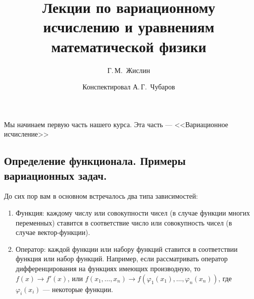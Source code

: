 \documentclass[12pt,a4paper,openany,fleqn]{book}
\theoremstyle{definition}
\begin{document}
	\author{Г.\,М.~Жислин}
	\title{Лекции по вариационному исчислению и уравнениям математической физики}
	\date{Конспектировал А.\,Г.~Чубаров}
	
	
	
	\maketitle
	
	
	\renewcommand{\thepart}{\Asbuk{part}}
	\renewcommand{\thechapter}{\arabic{chapter}}
	\renewcommand{\thesection}{\arabic{section}}
	\renewcommand{\thesubsection}{\Roman{subsection}}
	\renewcommand{\thefootnote}{\roman{footnote}}
	\renewcommand{\phi}{\varphi}

	
	\chapter{}
	\label{lecture1}
	Мы начинаем первую часть нашего курса. Эта часть --- <<Вариационное исчисление>>
	\section{Определение функционала. Примеры вариационных задач.}
	\label{lecture1section1}
	До сих пор вам в основном встречалось два типа зависимостей:
	\begin{enumerate}
		\item Функция: каждому числу или совокупности чисел (в случае функции многих переменных) ставится в соответствие число или совокупность чисел (в случае вектор-функции).
		
		\item Оператор: каждой функции или набору функций ставится в соответствии функция или набор функций. Например, если рассматривать оператор дифференцирования на функциях имеющих производную, то $f(x)\to f'(x)$, или $f(x_1,\ldots,x_n)\to f(\phi_1(x_1),\ldots,\phi_n(x_n))$, где \\ $\phi_i(x_i)$ --- некоторые функции.

	\end{enumerate}
\end{document}
